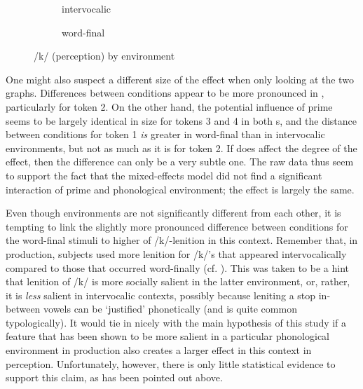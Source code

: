 \begin{figure}
	
	\begin{subfigure}{0.49\textwidth}
		
			\resizebox{\linewidth}{!}{} 
		\caption{intervocalic}
		\label{fig.bar.k.ext.intervoc}
	\end{subfigure}
	\begin{subfigure}{0.49\textwidth}
		
			\resizebox{\linewidth}{!}{}
		\caption{word-final}
		\label{fig.bar.k.ext.wordfinal}
	\end{subfigure}
	\caption{/k/ (perception) by environment}
	\label{fig.bar.k.ext.environment}
\end{figure}

One might also suspect a different size of the  effect when only looking at the two graphs.
Differences between conditions appear to be more pronounced in , particularly for token 2.
On the other hand, the potential influence of prime seems to be largely identical in size for tokens 3 and 4 in both s, and the distance between conditions for token 1 \emph{is} greater in word-final than in intervocalic environments, but not as much as it is for token 2.
If  does affect the degree of the  effect, then the difference can only be a very subtle one.
The raw data thus seem to support the fact that the mixed-effects model did not find a significant interaction of prime and phonological environment; the effect is largely the same.

Even though environments are not significantly different from each other, it is tempting to link the slightly more pronounced difference between  conditions for the word-final stimuli to higher  of /k/-lenition in this context.
Remember that, in production, subjects used more lenition for /k/'s that appeared intervocalically compared to those that occurred word-finally (cf. ).
This was taken to be a hint that lenition of /k/ is more socially salient in the latter environment, or, rather, it is \emph{less} salient in intervocalic contexts, possibly because leniting a stop in-between vowels can be `justified' phonetically (and is quite common typologically).
It would tie in nicely with the main hypothesis of this study if a feature that has been shown to be more salient in a particular phonological environment in production also creates a larger  effect in this context in perception.
Unfortunately, however, there is only little statistical evidence to support this claim, as has been pointed out above.

